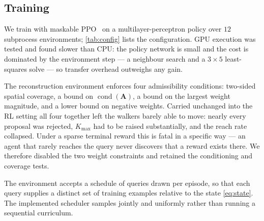 \subsection{Training}
\label{sec:mdp_training}

We train with maskable PPO~\cite{schulman2017ppo,raffin2021sb3} on a
multilayer-perceptron policy over $12$ subprocess environments;
\cref{tab:config} lists the configuration. GPU execution was tested and found
slower than CPU: the policy network is small and the cost is dominated by the
environment step --- a neighbour search and a $3\times 5$ least-squares solve
--- so transfer overhead outweighs any gain.

The reconstruction environment enforces four admissibility conditions:
two-sided spatial coverage, a bound on $\operatorname{cond}(\mathbf{A})$, a
bound on the largest weight magnitude, and a lower bound on negative weights.
Carried unchanged into the RL setting all four together left the walkers barely
able to move: nearly every proposal was rejected, $K_{\max}$ had to be raised
substantially, and the reach rate collapsed. Under a sparse terminal reward
this is fatal in a specific way --- an agent that rarely reaches the query
never discovers that a reward exists there. We therefore disabled the two
weight constraints and retained the conditioning and coverage tests.

The environment accepts a schedule of queries drawn per episode, so that each
query supplies a distinct set of training examples relative to the state
\eqref{eq:state}. The implemented scheduler samples jointly and uniformly
rather than running a sequential curriculum.
